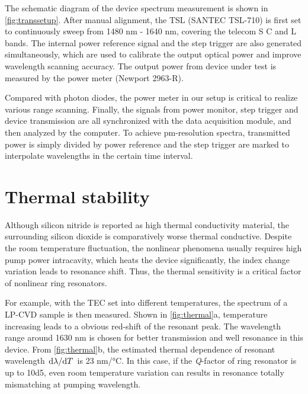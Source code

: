 The schematic diagram of the device spectrum measurement is shown in \autoref{fig:transsetup}. 
After manual alignment, the TSL (SANTEC TSL-710) is first set to continuously sweep from 1480 nm - 1640 nm, covering the telecom S C and L bands.
The internal power reference signal and the step trigger are also generated simultaneously, which are used to calibrate the output optical power and improve wavelength scanning accuracy. The output power from device under test is measured by the power meter (Newport 2963-R). 

Compared with photon diodes, the power meter in our setup is critical to realize various range scanning.  Finally, the signals from power monitor, step trigger and device transmission are all synchronized with the data acquisition module, and then analyzed by the computer. To achieve pm-resolution spectra, transmitted power is simply divided by power reference and the step trigger are marked to interpolate wavelengths in the certain time interval.


\section{Thermal stability}

\begin{figure}
	\centering
	
	\label{fig:thermal}
\end{figure}

Although silicon nitride is reported as high thermal conductivity material, the surrounding silicon dioxide is comparatively worse thermal conductive. Despite the room temperature fluctuation, the nonlinear phenomena usually requires high pump power intracavity, which heats the device significantly, the index change variation leads to resonance shift. Thus, the thermal sensitivity is a critical factor of nonlinear ring resonators.

For example, with the TEC set into different temperatures, the spectrum of a LP-CVD sample is then measured. Shown in \autoref{fig:thermal}a, temperature increasing leads to a obvious red-shift of the resonant peak. The wavelength range around 1630 nm is chosen for better transmission and well resonance in this device. From \autoref{fig:thermal}b, the estimated thermal dependence of resonant wavelength $\dv*{\lambda}{T}$ is 23 \si{\nm/\celsius}. In this case, if the \textit{Q}-factor of ring resonator is up to \num{10d5}, even room temperature variation can results in resonance totally mismatching at pumping wavelength.

